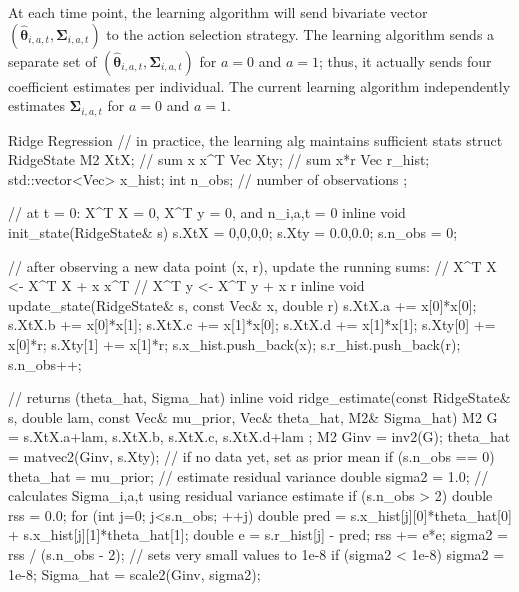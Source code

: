 \documentclass[letterpaper, 9pt]{extarticle}
\newcounter{nyscommentcounter}
\newcommand{\nys}[1]{%
  \stepcounter{nyscommentcounter}%
  {\color{nyscolor} [\textbf{NYS} (\thenyscommentcounter): {#1}]}%
}
\begin{document}
At each time point, the learning algorithm will send bivariate vector $(\hat{\boldsymbol{\theta}}_{i,a,t}, \boldsymbol{\Sigma}_{i,a,t})$ to the action selection strategy. 
The learning algorithm sends a separate set of $(\hat{\boldsymbol{\theta}}_{i,a,t}, \boldsymbol{\Sigma}_{i,a,t})$ for $a=0$ and $a=1$; thus, it actually sends four coefficient estimates per individual. The current learning algorithm independently estimates $\boldsymbol{\Sigma}_{i,a,t}$ for $a=0$ and $a=1$.
\label{ridge-alg}
\begin{codechunk}{Ridge Regression}
// in practice, the learning alg maintains sufficient stats
struct RidgeState {
    M2 XtX;  // sum x x^T
    Vec Xty; // sum x*r
    Vec r_hist;
    std::vector<Vec> x_hist;
    int n_obs; // number of observations 
};

// at t = 0: X^T X = 0, X^T y = 0, and n_{i,a,t} = 0
inline void init_state(RidgeState& s) {
    s.XtX = {0,0,0,0};
    s.Xty = {0.0,0.0};
    s.n_obs = 0;
}

// after observing a new data point (x, r), update the running sums:
// X^T X <- X^T X + x x^T
// X^T y <- X^T y + x r
inline void update_state(RidgeState& s, const Vec& x, double r) {
    s.XtX.a += x[0]*x[0]; s.XtX.b += x[0]*x[1];
    s.XtX.c += x[1]*x[0]; s.XtX.d += x[1]*x[1];
    s.Xty[0] += x[0]*r;   s.Xty[1] += x[1]*r;
    s.x_hist.push_back(x);
    s.r_hist.push_back(r);
    s.n_obs++;
}

// returns (theta_hat, Sigma_hat)
inline void ridge_estimate(const RidgeState& s, double lam, const Vec& mu_prior,
                            Vec& theta_hat, M2& Sigma_hat) {
    M2 G = { s.XtX.a+lam, s.XtX.b, s.XtX.c, s.XtX.d+lam };
    M2 Ginv = inv2(G);
    theta_hat = matvec2(Ginv, s.Xty);
    // if no data yet, set as prior mean
    if (s.n_obs == 0) theta_hat = mu_prior;
    // estimate residual variance
    double sigma2 = 1.0;
    // calculates Sigma_{i,a,t} using residual variance estimate
    if (s.n_obs > 2) {
        double rss = 0.0;
        for (int j=0; j<s.n_obs; ++j) {
            double pred = s.x_hist[j][0]*theta_hat[0] + s.x_hist[j][1]*theta_hat[1];
            double e = s.r_hist[j] - pred;
            rss += e*e;
        }
        sigma2 = rss / (s.n_obs - 2);
        // sets very small values to 1e-8
        if (sigma2 < 1e-8) sigma2 = 1e-8;
    }
    Sigma_hat = scale2(Ginv, sigma2);
}
\end{codechunk}
\end{document}
